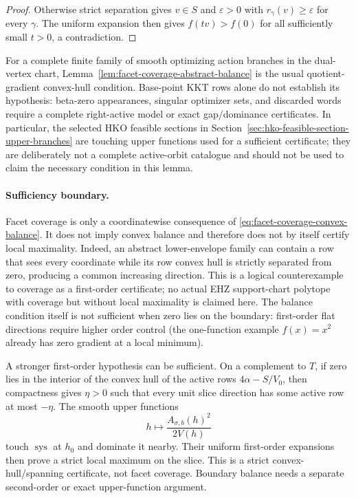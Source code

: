 \begin{unverified}
\begin{proof}
Otherwise strict separation gives $v\in S$ and $\varepsilon>0$ with
$r_\gamma(v)\geq\varepsilon$ for every $\gamma$.  The uniform expansion then
gives $f(tv)>f(0)$ for all sufficiently small $t>0$, a contradiction.
\end{proof}

For a complete finite family of smooth optimizing action branches in the
dual-vertex chart, Lemma~\ref{lem:facet-coverage-abstract-balance} is the usual
quotient-gradient convex-hull condition.  Base-point KKT rows alone do not
establish its hypothesis: beta-zero appearances, singular optimizer sets, and
discarded words require a complete right-active model or exact gap/dominance
certificates.  In particular, the selected HKO feasible sections in
Section~\ref{sec:hko-feasible-section-upper-branches} are touching upper
functions used for a sufficient certificate; they are deliberately not a
complete active-orbit catalogue and should not be used to claim the necessary
condition in this lemma.

\paragraph{Sufficiency boundary.}
Facet coverage is only a coordinatewise consequence of
\eqref{eq:facet-coverage-convex-balance}.  It does not imply convex balance and
therefore does not by itself certify local maximality.  Indeed, an abstract
lower-envelope family can contain a row that sees every coordinate while its
row convex hull is strictly separated from zero, producing a common increasing
direction.  This is a logical counterexample to coverage as a first-order
certificate; no actual EHZ support-chart polytope with coverage but without
local maximality is claimed here.  The balance condition itself is not
sufficient when zero lies on the boundary: first-order flat directions require
higher order control (the one-function example $f(x)=x^2$ already has zero
gradient at a local minimum).

A stronger first-order hypothesis can be sufficient.  On a complement to
$T$, if zero lies in the interior of the convex hull of the active rows
$4\alpha-S/V_0$, then compactness gives $\eta>0$ such that every unit slice
direction has some active row at most $-\eta$.  The smooth upper functions
\[
  h\longmapsto \frac{A_{\sigma,b}(h)^2}{2V(h)}
\]
touch $\operatorname{sys}$ at $h_0$ and dominate it nearby.  Their uniform
first-order expansions then prove a strict local maximum on the slice.  This
is a strict convex-hull/spanning certificate, not facet coverage.  Boundary
balance needs a separate second-order or exact upper-function argument.
\end{unverified}
